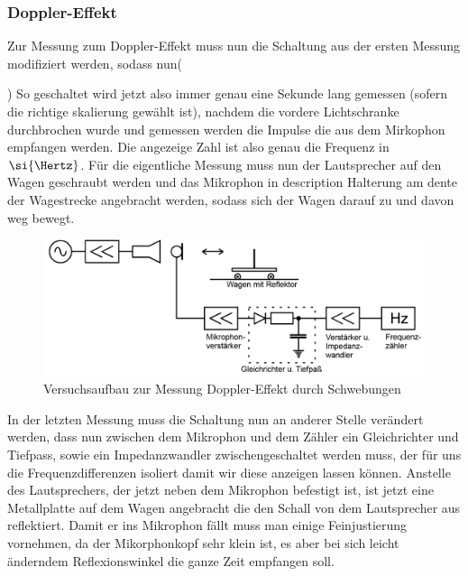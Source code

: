 \subsubsection{Doppler-Effekt}
\label{subs:Doppler-Effekt}
Zur Messung zum Doppler-Effekt muss nun die Schaltung aus der ersten Messung modifiziert werden, sodass nun(

)
So geschaltet wird jetzt also immer genau eine Sekunde lang gemessen (sofern die richtige skalierung gewählt ist),
nachdem die vordere Lichtschranke durchbrochen wurde und gemessen werden die Impulse die aus dem Mirkophon empfangen werden.
Die angezeige Zahl ist also genau die Frequenz in $\si{\Hertz}$. Für die eigentliche Messung muss nun der Lautsprecher auf den Wagen geschraubt werden und das Mikrophon in description
Halterung am dente der Wagestrecke angebracht werden, sodass sich der Wagen darauf zu und davon weg bewegt.


\begin{figure}
  \centering
  \includegraphics[width=\textwidth]{Wand.png}
  \caption{Versuchsaufbau zur Messung Doppler-Effekt durch Schwebungen}
  \label{fig:Schall}
\end{figure}


In der letzten Messung muss die Schaltung nun an anderer Stelle verändert werden, dass nun zwischen dem Mikrophon und dem Zähler ein Gleichrichter und Tiefpass,
sowie ein Impedanzwandler zwischengeschaltet werden muss, der für uns die Frequenzdifferenzen isoliert damit wir diese anzeigen lassen können.
Anstelle des Lautsprechers, der jetzt neben dem Mikrophon befestigt ist, ist jetzt eine Metallplatte auf dem Wagen angebracht die den Schall von dem Lautsprecher aus reflektiert.
Damit er ins Mikrophon fällt muss man einige Feinjustierung vornehmen, da der Mikorphonkopf sehr klein ist, es aber bei sich leicht änderndem Reflexionswinkel die ganze Zeit empfangen soll.
